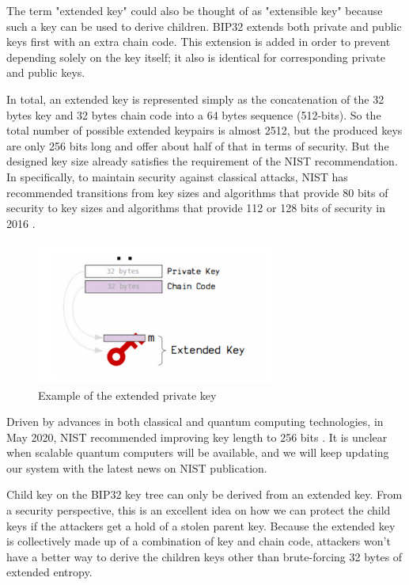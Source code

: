 The term "extended key" could also be thought of as "extensible key" because such a key can be used to derive children. BIP32 extends both private and public keys first with an extra chain code. This extension is added in order to prevent depending solely on the key itself; it also is identical for corresponding private and public keys.

In total, an extended key is represented simply as the concatenation of the 32 bytes key and 32 bytes chain code into a 64 bytes sequence (512-bits). So the total number of possible extended keypairs is almost 2512, but the produced keys are only 256 bits long and offer about half of that in terms of security. But the designed key size already satisfies the requirement of the NIST recommendation. In specifically, to maintain security against classical attacks, NIST has recommended transitions from key sizes and algorithms that provide 80 bits of security to key sizes and algorithms that provide 112 or 128 bits of security in 2016 \cite{Barker2019}.

\begin{figure}[ht!]
    \centering
    \includegraphics[width=0.7\textwidth]{images/extended_key.png}
    \caption[Example of the extended private key]{Example of the extended private key}
    \label{fig:extended_key}
\end{figure}

Driven by advances in both classical and quantum computing technologies, in May 2020, NIST recommended improving key length to 256 bits \cite{Barker2020}. It is unclear when scalable quantum computers will be available, and we will keep updating our system with the latest news on NIST publication.

Child key on the BIP32 key tree can only be derived from an extended key. From a security perspective, this is an excellent idea on how we can protect the child keys if the attackers get a hold of a stolen parent key. Because the extended key is collectively made up of a combination of key and chain code, attackers won’t have a better way to derive the children keys other than brute-forcing 32 bytes of extended entropy.

